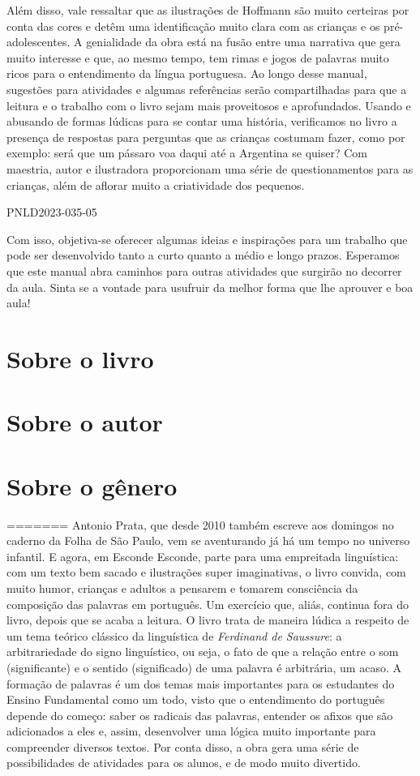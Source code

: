 \documentclass[11pt]{extarticle}
\begin{document}
Além disso, vale ressaltar que as ilustrações de Hoffmann são muito certeiras por conta das cores e detêm uma identificação muito clara com as crianças e os pré-adolescentes. A genialidade da obra está na fusão entre uma narrativa que gera muito interesse e que, ao mesmo tempo, tem rimas e jogos de palavras muito ricos para o entendimento da língua portuguesa. Ao longo desse manual, sugestões para atividades e algumas referências serão compartilhadas para que a leitura e o trabalho com o livro sejam mais proveitosos e aprofundados. Usando e abusando de formas lúdicas para se contar uma história, verificamos no livro a presença de respostas para perguntas que as crianças costumam fazer, como por exemplo: será que um pássaro voa daqui até a Argentina se quiser? Com maestria, autor e ilustradora proporcionam uma série de questionamentos para as crianças, além de aflorar muito a criatividade dos pequenos. 

PNLD2023-035-05

Com isso, objetiva-se oferecer algumas ideias e inspirações para um trabalho que pode ser desenvolvido tanto a curto quanto a médio e longo prazos. Esperamos que este manual abra caminhos para outras atividades que surgirão no decorrer da aula. Sinta se a vontade para usufruir da melhor forma que lhe aprouver e boa aula!

\section{Sobre o livro}

\section{Sobre o autor}

\section{Sobre o gênero}
=======
Antonio Prata, que desde 2010 também escreve aos domingos no caderno da Folha de São Paulo, vem se aventurando já há um tempo no universo infantil. E agora, em Esconde Esconde, parte para uma empreitada linguística: com um texto bem sacado e ilustrações super imaginativas, o livro convida, com muito humor, crianças e adultos a pensarem e tomarem consciência da composição das palavras em português. Um exercício que, aliás, continua fora do livro, depois que se acaba a leitura. O livro trata de maneira lúdica a respeito de um tema teórico clássico da linguística de \textit{Ferdinand de Saussure}: a arbitrariedade do signo linguístico, ou seja, o fato de que a relação entre o som (significante) e o sentido (significado) de uma palavra é arbitrária, um acaso. A formação de palavras é um dos temas mais importantes para os estudantes do Ensino Fundamental como um todo, visto que o entendimento do português depende do começo: saber os radicais das palavras, entender os afixos que são adicionados a eles e, assim, desenvolver uma lógica muito importante para compreender diversos textos. Por conta disso, a obra gera uma série de possibilidades de atividades para os alunos, e de modo muito divertido. 
\end{document}
